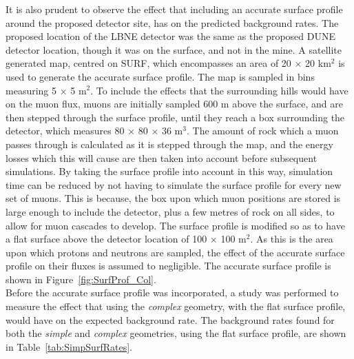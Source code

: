 It is also prudent to observe the effect that including an accurate surface profile around the proposed detector site, has on the predicted background rates. The proposed location of the LBNE detector was the same as the proposed DUNE detector location, though it was on the surface, and not in the mine. A satellite generated map, centred on SURF, which encompasses an area of 20 $\times$ 20 km$^2$ is used to generate the accurate surface profile. The map is sampled in bins measuring 5 $\times$ 5 m$^2$. To include the effects that the surrounding hills would have on the muon flux, muons are initially sampled 600 m above the surface, and are then stepped through the surface profile, until they reach a box surrounding the detector, which measures 80 $\times$ 80 $\times$ 36 m$^3$.  The amount of rock which a muon passes through is calculated as it is stepped through the map, and the energy losses which this will cause are then taken into account before subsequent simulations. By taking the surface profile into account in this way, simulation time can be reduced by not having to simulate the surface profile for every new set of muons. This is because, the box upon which muon positions are stored is large enough to include the detector, plus a few metres of rock on all sides, to allow for muon cascades to develop. The surface profile is modified so as to have a flat surface above the detector location of 100 $\times$ 100 m$^2$. As this is the area upon which protons and neutrons are sampled, the effect of the accurate surface profile on their fluxes is assumed to negligible. The accurate surface profile is shown in Figure~\ref{fig:SurfProf_Col}. \\

Before the accurate surface profile was incorporated, a study was performed to measure the effect that using the \emph{complex} geometry, with the flat surface profile, would have on the expected background rate. The background rates found for both the \emph{simple} and \emph{complex} geometries, using the flat surface profile, are shown in Table~\ref{tab:SimpSurfRates}. \\

